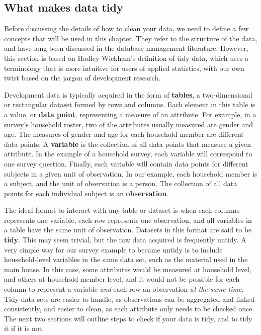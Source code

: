 \subsection{What makes data tidy}

Before discussing the details of how to clean your data,
we need to define a few concepts that will be used in this chapter.
They refer to the structure of the data,
and have long been discussed in the database management literature.
However, this section is based on Hadley Wickham's definition of tidy data,\cite{tidy-data}
which uses a terminology that is more intuitive for users of applied statistics,
with our own twist based on the jargon of development research.

Development data is typically acquired in the form of \textbf{tables},
a two-dimensional or rectangular dataset formed by rows and columns.
Each element in this table is a value, or \textbf{data point},
representing a measure of an attribute.
For example, in a survey's household roster,
two of the attributes usually measured are gender and age.
The measures of gender and age for each household member are different data points.
A \textbf{variable} is the collection of all data points that measure a given attribute.
In the example of a household survey,
each variable will correspond to one survey question.
Finally, each variable will contain data points for different subjects in a given unit of observation.
In our example, each household member is a subject, and the unit of observation is a person.
The collection of all data points for each individual subject is an \textbf{observation}.

The ideal format to interact with any table or dataset is when
each columns represents one variable, each row represents one observation, 
and all variables in a table have the same unit of observation.
Datasets in this format are said to be \textbf{tidy}.
This may seem trivial, but the raw data acquired is frequently untidy.
A very simple way for our survey example to became untidy is to include
household-level variables in the same data set,
such as the material used in the main house.
In this case, some attributes would be measured at
household level, and others at household member level,
and it would not be possible for each column to represent a variable
\textit{and} each row an observation \textit{at the same time}.
Tidy data sets are easier to handle,
as observations can be aggregated and linked consistently,
and easier to clean, as each attribute only needs to be checked once.
The next two sections will outline steps to check if your data is tidy,
and to tidy it if it is not.


